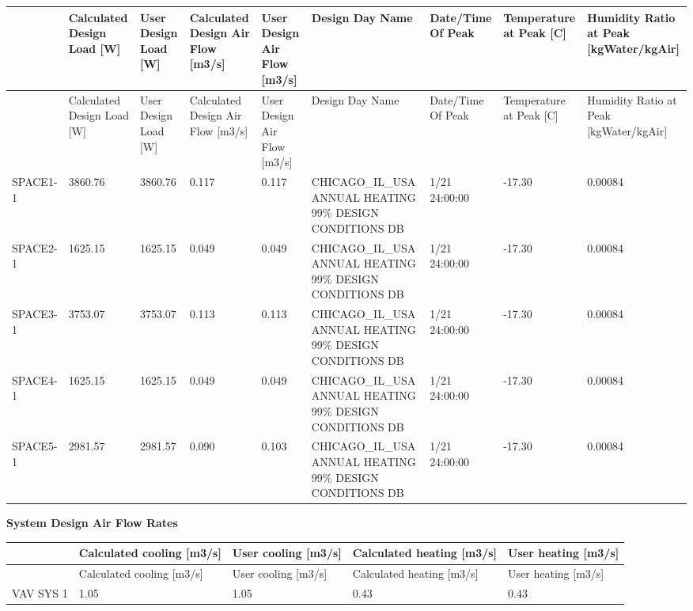 {\scriptsize
\begin{longtable}[c]{>{\raggedright}p{0.66in}>{\raggedright}p{0.66in}>{\raggedright}p{0.66in}>{\raggedright}p{0.66in}>{\raggedright}p{0.66in}>{\raggedright}p{0.66in}>{\raggedright}p{0.66in}>{\raggedright}p{0.66in}>{\raggedright}p{0.66in}}
\toprule
 & Calculated Design Load [W] & User Design Load [W] & Calculated Design Air Flow [m3/s] & User Design Air Flow [m3/s] & Design Day Name & Date/Time Of Peak & Temperature at Peak [C] & Humidity Ratio at Peak [kgWater/kgAir] \tabularnewline
\midrule
\endfirsthead

\toprule
 & Calculated Design Load [W] & User Design Load [W] & Calculated Design Air Flow [m3/s] & User Design Air Flow [m3/s] & Design Day Name & Date/Time Of Peak & Temperature at Peak [C] & Humidity Ratio at Peak [kgWater/kgAir] \tabularnewline
\midrule
\endhead

SPACE1-1 & 3860.76 & 3860.76 & 0.117 & 0.117 & CHICAGO\-\_IL\-\_USA ANNUAL HEATING 99\% DESIGN CONDITIONS DB & 1/21 24:00:00 & -17.30 & 0.00084 \tabularnewline
SPACE2-1 & 1625.15 & 1625.15 & 0.049 & 0.049 & CHICAGO\-\_IL\-\_USA ANNUAL HEATING 99\% DESIGN CONDITIONS DB & 1/21 24:00:00 & -17.30 & 0.00084 \tabularnewline
SPACE3-1 & 3753.07 & 3753.07 & 0.113 & 0.113 & CHICAGO\-\_IL\-\_USA ANNUAL HEATING 99\% DESIGN CONDITIONS DB & 1/21 24:00:00 & -17.30 & 0.00084 \tabularnewline
SPACE4-1 & 1625.15 & 1625.15 & 0.049 & 0.049 & CHICAGO\-\_IL\-\_USA ANNUAL HEATING 99\% DESIGN CONDITIONS DB & 1/21 24:00:00 & -17.30 & 0.00084 \tabularnewline
SPACE5-1 & 2981.57 & 2981.57 & 0.090 & 0.103 & CHICAGO\-\_IL\-\_USA ANNUAL HEATING 99\% DESIGN CONDITIONS DB & 1/21 24:00:00 & -17.30 & 0.00084 \tabularnewline
\bottomrule
\end{longtable}}

\textbf{System Design Air Flow Rates}

\begin{longtable}[c]{>{\raggedright}p{1.2in}>{\raggedright}p{1.2in}>{\raggedright}p{1.2in}>{\raggedright}p{1.2in}>{\raggedright}p{1.2in}}
\toprule
 & Calculated cooling [m3/s] & User cooling [m3/s] & Calculated heating [m3/s] & User heating [m3/s] \tabularnewline
\midrule
\endfirsthead

\toprule
 & Calculated cooling [m3/s] & User cooling [m3/s] & Calculated heating [m3/s] & User heating [m3/s] \tabularnewline
\midrule
\endhead

VAV SYS 1 & 1.05 & 1.05 & 0.43 & 0.43 \tabularnewline
\bottomrule
\end{longtable}

